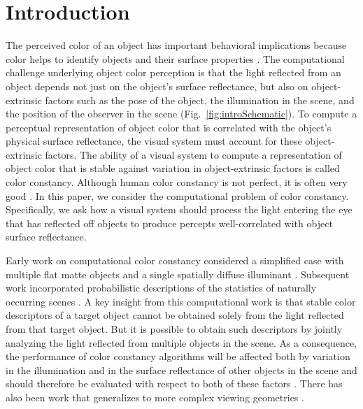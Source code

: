 \documentclass{jov}
\begin{document}
\section{Introduction}
The perceived color of an object has important behavioral implications because color helps to identify objects and their surface properties \cite{Mollon89, Jacobs81}.
The computational challenge underlying object color perception is that the light reflected from an object depends not just on the object's surface reflectance, but also 
on object-extrinsic factors such as the pose of the object, the illumination in the scene, and the position of the observer in the scene (Fig.~\ref{fig:introSchematic}).
To compute a perceptual representation of object color that is correlated with the object's physical surface reflectance, the visual system must account for these object-extrinsic factors.
The ability of a visual system to compute a representation of object color that is stable against variation in object-extrinsic factors is called color constancy. 
Although human color constancy is not perfect, it is often very good \cite{FosterColorConstancy, BrainardColorConstancy}. 
In this paper, we consider the computational problem of color constancy.
Specifically, we ask how a visual system should process the light entering the eye that has reflected off objects to produce percepts well-correlated with object surface reflectance.

Early work on computational color constancy considered a simplified case with multiple flat matte objects and a single spatially diffuse illuminant \cite{LandRetinex,Buchsbaum80,MaloneyWandell86}.
Subsequent work incorporated probabilistic descriptions of the statistics of naturally occurring scenes \cite{D'ZmuraConstancy3, D'ZmuraIversonSinger,BrainardFreeman}.
A key insight from this computational work is that stable color descriptors of a target object cannot be obtained solely from the light reflected from that target object.
But it is possible to obtain such descriptors by jointly analyzing the light reflected from multiple objects in the scene.
As a consequence, the performance of color constancy algorithms will be affected both by variation in the illumination and in the surface reflectance of other objects in the scene and should therefore be evaluated with respect to both of these factors \cite{BrainardWandellRetinex,BrainardFreeman}. 
There has also been work that generalizes to more complex viewing geometries \cite{funt1988color, barron2012color}.
\end{document}
